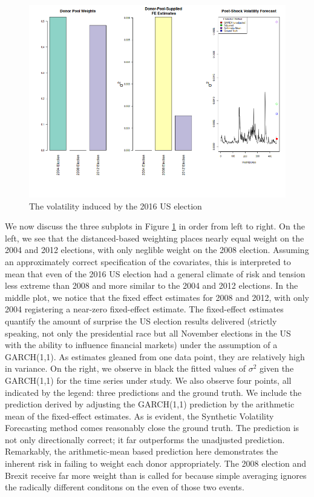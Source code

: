 \documentclass[11pt]{article}
\theoremstyle{definition}
\begin{document}
\begin{figure}[h!]
\begin{center}
  \includegraphics[scale=.5]{real_data_output_plots/savetime_WedJan1010:56:32PM2024_IYG_CL=F-^VIX-^IRX-^FVX-^TNX-^TYX_^VIX_2016-11-08-2004-11-02-2008-11-04-2012-11-06.png}
  \caption{The volatility induced by the 2016 US election}
  \label{fig:SVF_2016}
  \end{center}
\end{figure}

We now discuss the three subplots in Figure \ref{fig:SVF_2016} in order from left to right.  On the left, we see that the distanced-based weighting places nearly equal weight on the 2004 and 2012 elections, with only neglible weight on the 2008 election.  Assuming an approximately correct specification of the covariates, this is interpreted to mean that even of the 2016 US election had a general climate of risk and tension less extreme than 2008 and more similar to the 2004 and 2012 elections.  In the middle plot, we notice that the fixed effect estimates for 2008 and 2012, with only 2004 registering a near-zero fixed-effect estimate.  The fixed-effect estimates quantify the amount of surprise the US election results delivered (strictly speaking, not only the presidential race but all November elections in the US with the ability to influence financial markets) under the assumption of a GARCH(1,1).  As estimates gleaned from one data point, they are relatively high in variance.  On the right, we observe in black the fitted values of $\sigma^{2}$ given the GARCH(1,1) for the time series under study.  We also observe four points, all indicated by the legend: three predictions and the ground truth.  We include the prediction derived by adjusting the GARCH(1,1) prediction by the arithmetic mean of the fixed-effect estimates.  As is evident, the Synthetic Volatility Forecasting method comes reasonably close the ground truth.  The prediction is not only directionally correct; it far outperforms the unadjusted prediction.  Remarkably, the arithmetic-mean based prediction here demonstrates the inherent risk in failing to weight each donor appropriately.  The 2008 election and Brexit receive far more weight than is called for because simple averaging ignores the radically different conditons on the even of those two events. \\
\end{document}
